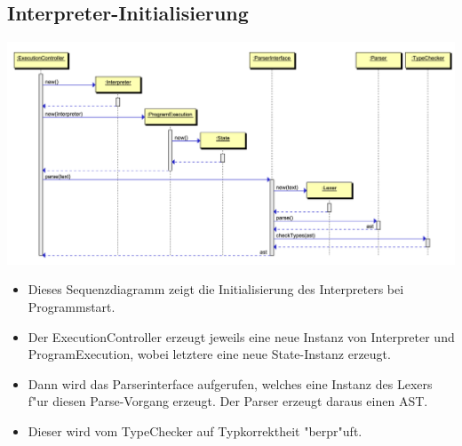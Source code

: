 \documentclass[10pt,a4paper,titlepage]{article}
\begin{document}
\subsection{Interpreter-Initialisierung}
\includegraphics[scale=0.9]{images/interpreter_init.pdf} \newline
\begin{itemize}
\item Dieses Sequenzdiagramm zeigt die Initialisierung des Interpreters bei Programmstart.
\item Der ExecutionController erzeugt jeweils eine neue Instanz von Interpreter und ProgramExecution, wobei letztere eine neue State-Instanz erzeugt.
\item Dann wird das Parserinterface aufgerufen, welches eine Instanz des Lexers f"ur diesen Parse-Vorgang erzeugt. Der Parser erzeugt daraus einen AST.
\item Dieser wird vom TypeChecker auf Typkorrektheit "berpr"uft.
\end{itemize}
\end{document}

